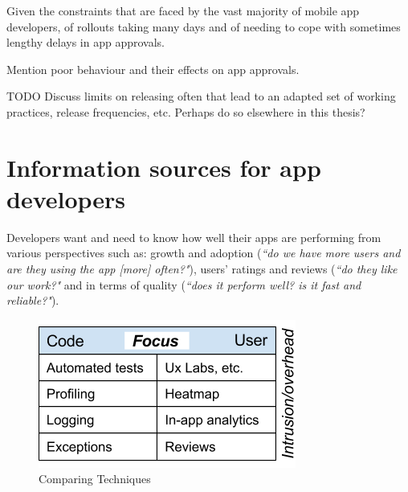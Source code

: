 Given the constraints that are faced by the vast majority of mobile app developers, of rollouts taking many days and of needing to cope with sometimes lengthy delays in app approvals. 

Mention poor behaviour and their effects on app approvals.

TODO Discuss limits on releasing often that lead to an adapted set of working practices, release frequencies, etc. Perhaps do so elsewhere in this thesis?


\section{Information sources for app developers}
Developers want and need to know how well their apps are performing from various perspectives such as: growth and adoption (\emph{``do we have more users and are they using the app [more] often?"}), users' ratings and reviews (\emph{``do they like our work?"} and in terms of quality (\emph{``does it perform well? is it fast and reliable?"}). 

\begin{figure}[ht]
    \centering
    \includegraphics{images/ComparingTechniquesRHS.png}
    \caption{Comparing Techniques}
    \label{fig:comparing_techniques}
\end{figure}

